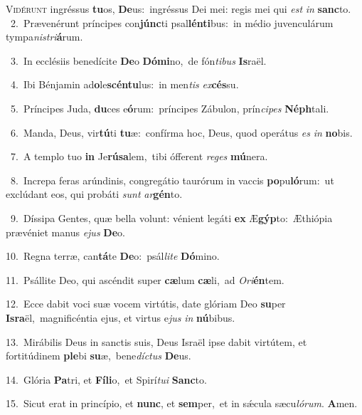 \lettrine{\initial\textcolor{\initialcolor}{V}}{idérunt} ingréssus \textbf{tu}\-os, \textbf{De}\-us:~\star ingréssus Dei mei: regis mei qui \textit{est} \textit{in} \textbf{sanc}\-to.\\
{\numbfont\textcolor{\numbcolor}{~2.}}~Prævenérunt príncipes con\-\textbf{júnc}\-ti psal\-\textbf{lén}\-\textbf{ti}bus:~\star in médio juvenculárum tympa\-\textit{nis}\-\textit{tri}\textbf{á}rum.\par
{\numbfont\textcolor{\numbcolor}{~3.}}~In ecclésiis benedícite \textbf{De}\-o \textbf{Dó}\-\textbf{mi}no,~\star de fón\-\textit{ti}\-\textit{bus} \textbf{Is}\-raël.\par
{\numbfont\textcolor{\numbcolor}{~4.}}~Ibi Bénjamin ad\-\textbf{o}\-le\-\textbf{scén}\-\textbf{tu}lus:~\star in men\textit{tis} \textit{ex}\-\textbf{cés}su.\par
{\numbfont\textcolor{\numbcolor}{~5.}}~Príncipes Juda, \textbf{du}\-ces e\-\textbf{ó}\-rum:~\star príncipes Zábulon, prín\-\textit{ci}\-\textit{pes} \textbf{Néph}\-tali.\par
{\numbfont\textcolor{\numbcolor}{~6.}}~Manda, Deus, vir\-\textbf{tú}\-ti \textbf{tu}\-æ:~\star confírma hoc, Deus, quod operátus \textit{es} \textit{in} \textbf{no}\-bis.\par
{\numbfont\textcolor{\numbcolor}{~7.}}~A templo tuo \textbf{in} Je\-\textbf{rú}\-\textbf{sa}lem,~\star tibi ófferent \textit{re}\-\textit{ges} \textbf{mú}\-nera.\par
{\numbfont\textcolor{\numbcolor}{~8.}}~Increpa feras arúndinis, congregátio taurórum in vaccis \textbf{po}\-pu\-\textbf{ló}\-rum:~\star ut exclúdant eos, qui probáti \textit{sunt} \textit{ar}\-\textbf{gén}to.\par
{\numbfont\textcolor{\numbcolor}{~9.}}~Díssipa Gentes, quæ bella volunt: vénient legáti \textbf{ex} Æ\-\textbf{gýp}\-to:~\star Æthiópia prævéniet manus \textit{e}\-\textit{jus} \textbf{De}\-o.\par
{\numbfont\textcolor{\numbcolor}{10.}}~Regna terræ, can\-\textbf{tá}\-te \textbf{De}\-o:~\star psál\-\textit{li}\-\textit{te} \textbf{Dó}\-mino.\par
{\numbfont\textcolor{\numbcolor}{11.}}~Psállite Deo, qui ascéndit super \textbf{cæ}\-lum \textbf{cæ}\-li,~\star ad \textit{O}\-\textit{ri}\textbf{én}tem.\par
{\numbfont\textcolor{\numbcolor}{12.}}~Ecce dabit voci suæ vocem virtútis, date glóriam Deo \textbf{su}\-per \textbf{Is}\-\textbf{ra}ël,~\star magnificéntia ejus, et virtus e\textit{jus} \textit{in} \textbf{nú}\-bibus.\par
{\numbfont\textcolor{\numbcolor}{13.}}~Mirábilis Deus in sanctis suis, Deus Israël ipse dabit virtútem, et fortitúdinem \textbf{ple}\-bi \textbf{su}\-æ,~\star bene\-\textit{díc}\-\textit{tus} \textbf{De}\-us.\par
{\numbfont\textcolor{\numbcolor}{14.}}~Glória \textbf{Pa}\-tri, et \textbf{Fí}\-\textbf{li}o,~\star et Spirí\-\textit{tu}\-\textit{i} \textbf{Sanc}\-to.\par
{\numbfont\textcolor{\numbcolor}{15.}}~Sicut erat in princípio, et \textbf{nunc}\-, et \textbf{sem}\-per,~\star et in sǽcula sæcu\-\textit{ló}\-\textit{rum}. \textbf{A}\-men.\par
